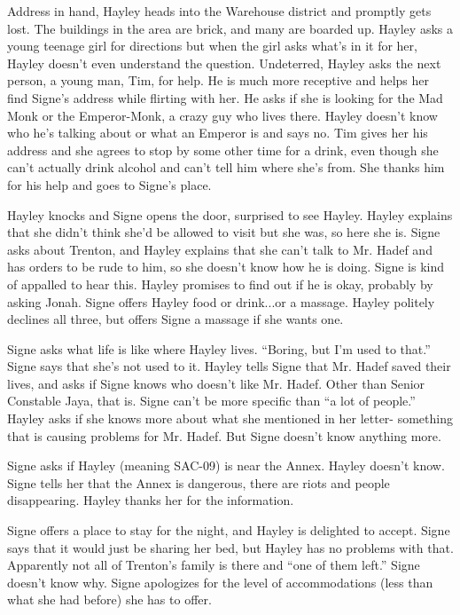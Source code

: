 Address in hand, Hayley heads into the Warehouse district and promptly gets lost.  The buildings in the area are brick, and many are boarded up.  Hayley asks a young teenage girl for directions but when the girl asks what's in it for her, Hayley doesn't even understand the question.  Undeterred, Hayley asks the next person, a young man, Tim, for help.  He is much more receptive and helps her find Signe's address while flirting with her.  He asks if she is looking for the Mad Monk or the Emperor-Monk, a crazy guy who lives there.  Hayley doesn't know who he's talking about or what an Emperor is and says no.  Tim gives her his address and she agrees to stop by some other time for a drink, even though she can't actually drink alcohol and can't tell him where she's from.  She thanks him for his help and goes to Signe's place.



Hayley knocks and Signe opens the door, surprised to see Hayley.  Hayley explains that she didn't think she'd be allowed to visit but she was, so here she is.  Signe asks about Trenton, and Hayley explains that she can't talk to Mr. Hadef and has orders to be rude to him, so she doesn't know how he is doing.  Signe is kind of appalled to hear this.  Hayley promises to find out if he is okay, probably by asking Jonah.  Signe offers Hayley food or drink...or a massage.  Hayley politely declines all three, but offers Signe a massage if she wants one.



Signe asks what life is like where Hayley lives.  ``Boring, but I'm used to that.''  Signe says that she's not used to it.  Hayley tells Signe that Mr. Hadef saved their lives, and asks if Signe knows who doesn't like Mr. Hadef. Other than Senior Constable Jaya, that is.  Signe can't be more specific than ``a lot of people.''  Hayley asks if she knows more about what she mentioned in her letter- something that is causing problems for Mr. Hadef.  But Signe doesn't know anything more.



Signe asks if Hayley (meaning SAC-09) is near the Annex.  Hayley doesn't know.  Signe tells her that the Annex is dangerous, there are riots and people disappearing.  Hayley thanks her for the information.



Signe offers a place to stay for the night, and Hayley is delighted to accept.  Signe says that it would just be sharing her bed, but Hayley has no problems with that.  Apparently not all of Trenton's family is there and ``one of them left.''  Signe doesn't know why.  Signe apologizes for the level of accommodations (less than what she had before) she has to offer.



